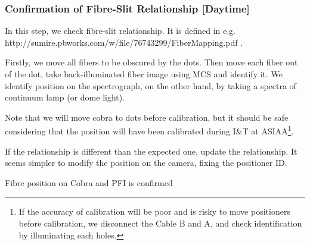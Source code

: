\subsubsection{Confirmation of Fibre-Slit Relationship [Daytime]}\label{secflow:FibID}

In this step, we check fibre-slit relationship.
It is defined in e.g. \\
 http://sumire.pbworks.com/w/file/76743299/FiberMapping.pdf .

Firstly, we move all fibers to be obscured by the dots.
Then move each fiber out of the dot, take back-illuminated fiber image using MCS and identify it.
We identify position on the spectrograph, on the other hand, by taking a spectra of continuum lamp (or dome light).

Note that we will move cobra to dots before calibration, but it should be safe considering that the position will have been calibrated during I\&T at ASIAA\footnote{If the accuracy of calibration will be poor and is risky to move positioners before calibration, we disconnect the Cable B and A, and check identification by illuminating each holes.}.


If the relationship is different than the expected one, update the relationship.
It seems simpler to modify the position on the camera, fixing the positioner ID.


\begin{itembox}[l]{}
Fibre position on Cobra and PFI is confirmed
\end{itembox}